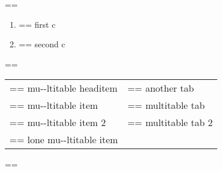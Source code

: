 \documentclass{book}
\makeatletter
\newenvironment{Texinfopreformatted}{%
  \par\GNUTobeylines\obeyspaces\frenchspacing\parskip=\z@\parindent=\z@}{}
{\catcode`\^^M=13 \gdef\GNUTobeylines{\catcode`\^^M=13 \def^^M{\null\par}}}
\newenvironment{Texinfoindented}{\begin{list}{}{}\item\relax}{\end{list}}
\renewcommand{\_}{\Texinfounderscore\discretionary{}{}{}}
\makeatother
\begin{document}
\begin{Texinfoindented}
\begin{enumerate}[label=\alph*.]
\end{enumerate}
\begin{Texinfopreformatted}%
\ttfamily 
\end{Texinfopreformatted}
\begin{enumerate}[label=\alph*.,start=3]
\item \begin{Texinfopreformatted}%
\ttfamily first c
\end{Texinfopreformatted}
\item \begin{Texinfopreformatted}%
\ttfamily second c
\end{Texinfopreformatted}
\end{enumerate}
\begin{Texinfopreformatted}%
\ttfamily 
\end{Texinfopreformatted}
\begin{tabular}{m{} m{}}%
\begin{Texinfopreformatted}%
\ttfamily mu{-}{-}ltitable headitem \end{Texinfopreformatted}&
\begin{Texinfopreformatted}%
\ttfamily another tab
\end{Texinfopreformatted}\\
\begin{Texinfopreformatted}%
\ttfamily mu{-}{-}ltitable item \end{Texinfopreformatted}&
\begin{Texinfopreformatted}%
\ttfamily multitable tab
\end{Texinfopreformatted}\\
\begin{Texinfopreformatted}%
\ttfamily mu{-}{-}ltitable item 2 \end{Texinfopreformatted}&
\begin{Texinfopreformatted}%
\ttfamily multitable tab 2
\index[cp]{index entry within multitable@index entry within multitable}%
\end{Texinfopreformatted}\\
\begin{Texinfopreformatted}%
\ttfamily lone mu{-}{-}ltitable item
\end{Texinfopreformatted}&\\
\end{tabular}%
\begin{Texinfopreformatted}%
\ttfamily 
\end{Texinfopreformatted}
\begin{tabular}{m{} m{}}%

\end{tabular}
\end{Texinfoindented}
\end{document}
